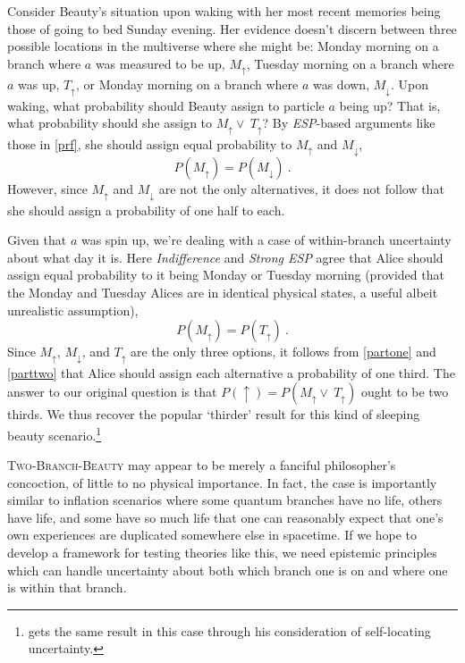 \documentclass[onecolumn,secnumarabic,amsmath,amssymb,balancelastpage,nofootinbib]{article}
\begin{document}
Consider {Beauty's} situation upon waking with her most recent memories being those of going to bed Sunday evening. {Her} evidence doesn't discern between three possible locations in the multiverse where she might be: Monday morning on a branch where $a$ was measured to be up, $M_\uparrow $, Tuesday morning on a branch where $a$ was up, $T_\uparrow$, or Monday morning on a branch where $a$ was down, $M_\downarrow$.  Upon waking, what probability should Beauty assign to particle $a$ being up?  That is, what probability should she assign to $M_\uparrow \vee\: T_\uparrow$?  By \emph{ESP}-based arguments like those in \textsection \ref{prf}, she should assign equal probability to $M_\uparrow$ and $M_\downarrow$,
\begin{equation}
P\left(M_\uparrow\right)=P\left(M_\downarrow\right)\ .
\label{partone}
\end{equation}
However, since $M_\uparrow$ and $M_\downarrow$ are not the only alternatives, it does not follow that she should assign a probability of one half to each.

Given that $a$ was spin up, we're dealing with a case of within-branch uncertainty about what day it is.  Here \emph{Indifference} and \emph{Strong ESP} agree that Alice should assign equal probability to it being Monday or Tuesday morning (provided that the Monday and Tuesday Alices are in identical physical states, a useful albeit unrealistic assumption), 
\begin{equation}
P\left(M_\uparrow\right)=P\left(T_\uparrow\right)\ .
\label{parttwo}
\end{equation}
Since $M_\uparrow$, $M_\downarrow$, and $T_\uparrow$ are the only three options, it follows from \eqref{partone} and \eqref{parttwo} that Alice should assign each alternative a probability of one third.  The answer to our original question is that $P\left(\uparrow\right)=P\left(M_\uparrow \vee\: T_\uparrow\right)$ ought to be two thirds.  We thus recover the popular `thirder' result for this kind of sleeping beauty scenario.\footnote{\citet[]{vaidman2011} gets the same result in this case through his consideration of self-locating uncertainty.}

\textsc{Two-Branch-Beauty} may appear to be merely a fanciful philosopher's concoction, of little to no physical importance.  In fact, the case is importantly similar to inflation scenarios where some quantum branches have no life, others have life, and some have so much life that one can reasonably expect that one's own experiences are duplicated somewhere else in spacetime.  If we hope to develop a framework for testing theories like this, we need epistemic principles which can handle uncertainty about both which branch one is on and where one is within that branch.
\end{document}
